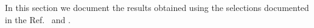 In this section we document the results obtained using the selections 
documented  in the Ref.~\cite{HZZ2011EPS} and \cite{HZZ2011EPSPAS}. 
